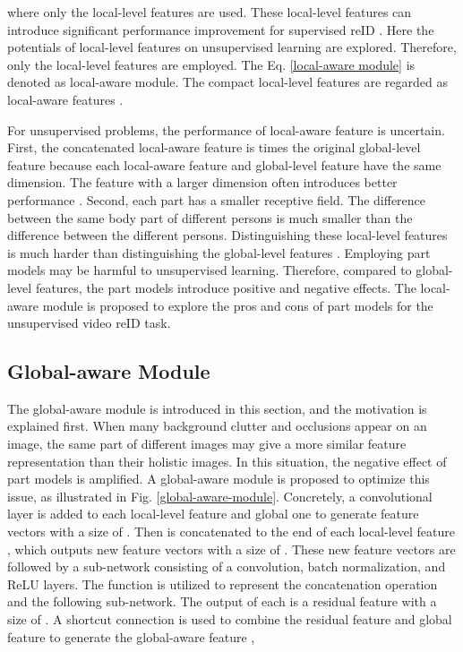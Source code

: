 \documentclass{cta-author}
\begin{document}
	where only the local-level features  are used. These local-level features can introduce significant performance improvement for supervised reID \cite{RN191}. Here the potentials of local-level features on unsupervised learning are explored. Therefore, only the local-level features are employed. The Eq. \ref{local-aware module} is denoted as local-aware module. The compact local-level features  are regarded as local-aware features . 
	
	For unsupervised problems, the performance of local-aware feature is uncertain. First, the concatenated local-aware feature is  times the original global-level feature because each local-aware feature and global-level feature have the same dimension. The feature with a larger dimension often introduces better performance \cite{RN191}. Second, each part has a smaller receptive field. The difference between the same body part of different persons is much smaller than the difference between the different persons. Distinguishing these local-level features is much harder than distinguishing the global-level features \cite{RN98}. Employing part models may be harmful to unsupervised learning. Therefore, compared to global-level features, the part models introduce positive and negative effects. The local-aware module is proposed to explore the pros and cons of part models for the unsupervised video reID task.
	
	\subsection{Global-aware Module} \label{global-aware}
	The global-aware module is introduced in this section, and the motivation is explained first. When many background clutter and occlusions appear on an image, the same part of different images may give a more similar feature representation than their holistic images. In this situation, the negative effect of part models is amplified. A global-aware module is proposed to optimize this issue, as illustrated in Fig. \ref{global-aware-module}. Concretely, a  convolutional layer is added to each local-level feature  and global one  to generate feature vectors  with a size of . Then  is concatenated to the end of each local-level feature , which outputs new feature vectors with a size of . These new feature vectors are followed by a sub-network consisting of a  convolution, batch normalization, and ReLU layers. The function  is utilized to represent the concatenation operation and the following sub-network. The output of each  is a residual feature  with a size of . A shortcut connection \cite{RN73} is used to combine the residual feature  and global feature  to generate the global-aware feature ,
	
\end{document}
